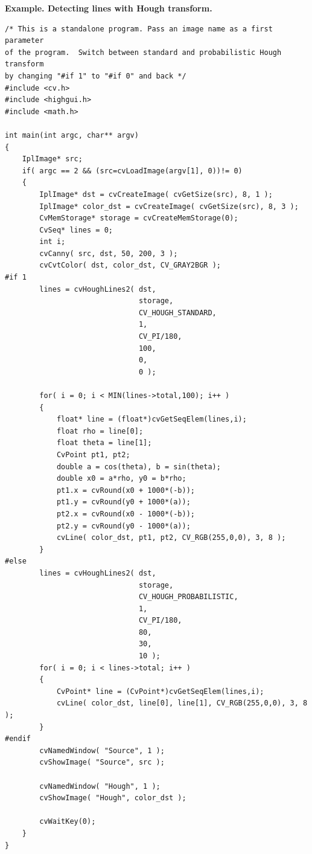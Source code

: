 \ifC
\textbf{Example. Detecting lines with Hough transform.}
\begin{lstlisting}
/* This is a standalone program. Pass an image name as a first parameter
of the program.  Switch between standard and probabilistic Hough transform
by changing "#if 1" to "#if 0" and back */
#include <cv.h>
#include <highgui.h>
#include <math.h>

int main(int argc, char** argv)
{
    IplImage* src;
    if( argc == 2 && (src=cvLoadImage(argv[1], 0))!= 0)
    {
        IplImage* dst = cvCreateImage( cvGetSize(src), 8, 1 );
        IplImage* color_dst = cvCreateImage( cvGetSize(src), 8, 3 );
        CvMemStorage* storage = cvCreateMemStorage(0);
        CvSeq* lines = 0;
        int i;
        cvCanny( src, dst, 50, 200, 3 );
        cvCvtColor( dst, color_dst, CV_GRAY2BGR );
#if 1
        lines = cvHoughLines2( dst,
                               storage,
                               CV_HOUGH_STANDARD,
                               1,
                               CV_PI/180,
                               100,
                               0,
                               0 );

        for( i = 0; i < MIN(lines->total,100); i++ )
        {
            float* line = (float*)cvGetSeqElem(lines,i);
            float rho = line[0];
            float theta = line[1];
            CvPoint pt1, pt2;
            double a = cos(theta), b = sin(theta);
            double x0 = a*rho, y0 = b*rho;
            pt1.x = cvRound(x0 + 1000*(-b));
            pt1.y = cvRound(y0 + 1000*(a));
            pt2.x = cvRound(x0 - 1000*(-b));
            pt2.y = cvRound(y0 - 1000*(a));
            cvLine( color_dst, pt1, pt2, CV_RGB(255,0,0), 3, 8 );
        }
#else
        lines = cvHoughLines2( dst,
                               storage,
                               CV_HOUGH_PROBABILISTIC,
                               1,
                               CV_PI/180,
                               80,
                               30,
                               10 );
        for( i = 0; i < lines->total; i++ )
        {
            CvPoint* line = (CvPoint*)cvGetSeqElem(lines,i);
            cvLine( color_dst, line[0], line[1], CV_RGB(255,0,0), 3, 8 );
        }
#endif
        cvNamedWindow( "Source", 1 );
        cvShowImage( "Source", src );

        cvNamedWindow( "Hough", 1 );
        cvShowImage( "Hough", color_dst );

        cvWaitKey(0);
    }
}
\end{lstlisting}

